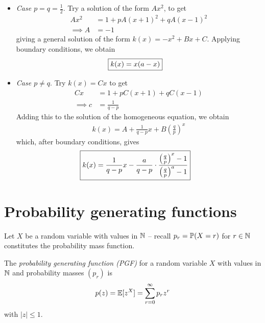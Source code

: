 \documentclass{../template/note}
\begin{document}
    \begin{itemize}
        \item \emph{Case \(p=q=\frac 1 2\)}. Try a solution of the form \(Ax^2\), to get
        \begin{align*}
            Ax^2 &= 1 + pA(x+1)^2 + qA(x-1)^2 \\
            \implies A &= -1
        \end{align*}
        giving a general solution of the form \(k(x) = -x^2 + Bx + C\). Applying boundary conditions, we obtain
        \begin{align*}
            \Aboxed{k(x) = x(a-x)}
        \end{align*}
        \item \emph{Case \(p\neq q\)}. Try \(k(x) = Cx\) to get
        \begin{align*}
            Cx &= 1 + pC(x+1) + qC(x-1) \\
            \implies c &= \frac 1 {q-p}
        \end{align*}
        Adding this to the solution of the homogeneous equation, we obtain
        \begin{align*}
            k(x) = A + \frac 1 {q-p} x + B\left(\frac q p\right)^x
        \end{align*}
        which, after boundary conditions, gives
        \begin{align*}
            \Aboxed{k(x) = \frac 1 {q-p} x - \frac a {q-p}\cdot\frac{\left(\frac q p\right)^x - 1}{\left(\frac q p\right)^a-1}}
        \end{align*}
    \end{itemize}
    
    \section{Probability generating functions}

    Let \(X\) be a random variable with values in \(\mathbb N\) -- recall \(p_r = \mathbb P(X=r)\) for \(r \in \mathbb N\) constitutes the probability mass function.

    \begin{definition}
        The \emph{probability generating function (PGF)} for a random variable \(X\) with values in \(\mathbb N\) and probability masses \((p_r)\) is
        \begin{align*}
            p(z) = \mathbb E[z^X] = \sum_{r=0}^\infty p_r z^r
        \end{align*}
        with \(|z| \leq 1\).        
    \end{definition}
    
\end{document}

